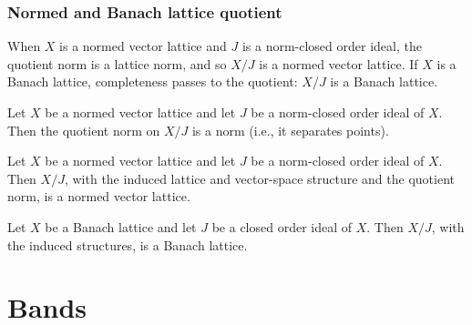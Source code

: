 \subsubsection{Normed and Banach lattice quotient}

When $X$ is a normed vector lattice and $J$ is a norm-closed order
ideal, the quotient norm is a lattice norm, and so $X / J$ is a
normed vector lattice. If $X$ is a Banach lattice, completeness
passes to the quotient: $X / J$ is a Banach lattice.

\begin{lemma}
\label{lem:orderIdeal-quotientNormedAddCommGroup}
\leanok
{}
Let $X$ be a normed vector lattice and let $J$ be a norm-closed
order ideal of $X$. Then the quotient norm on $X / J$ is a norm
(i.e., it separates points).
\end{lemma}

\begin{theorem}
\label{thm:orderIdeal-quotientNormedVectorLattice}
\leanok
{}
Let $X$ be a normed vector lattice and let $J$ be a norm-closed
order ideal of $X$. Then $X / J$, with the induced lattice and
vector-space structure and the quotient norm, is a normed vector
lattice.
\end{theorem}

\begin{theorem}
\label{thm:orderIdeal-quotientBanachLattice}
\leanok
{}
Let $X$ be a Banach lattice and let $J$ be a closed order ideal of
$X$. Then $X / J$, with the induced structures, is a Banach
lattice.
\end{theorem}

\section{Bands}

